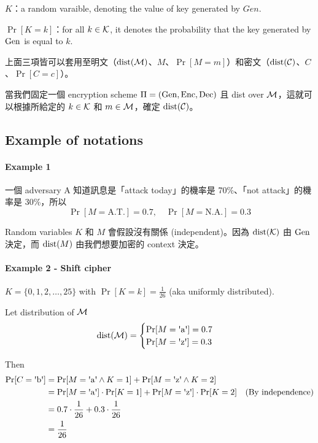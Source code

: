 \(K\)：a random varaible, denoting the value of key generated by \(Gen\).

\(\Pr[K = k]\)：for all \(k \in \operatorname{\mathcal{K}}\), it denotes the probability that the key generated by \(\operatorname{Gen}\) is equal to \(k\).

上面三項皆可以套用至明文（\(\operatorname{dist}(\operatorname{\mathcal{M}})\)、\(M\)、\(\Pr[M = m]\)）和密文（\(\operatorname{dist}(\operatorname{\mathcal{C}})\)、\(C\)、\(\Pr[C = c]\)）。

當我們固定一個 encryption scheme \(\Pi = (\operatorname{Gen}, \operatorname{Enc}, \operatorname{Dec})\) 且 dist over \(\operatorname{\mathcal{M}}\)，這就可以根據所給定的 \(k \in \operatorname{\mathcal{K}}\) 和 \(m \in \operatorname{\mathcal{M}}\)，確定 \(\operatorname{dist}(\operatorname{\mathcal{C}})\)。


\subsection{Example of notations}


\paragraph{Example 1}

一個 adversary A 知道訊息是「attack today」的機率是 70\%、「not attack」的機率是 30\%，所以
\[\Pr[M=\mathrm{A.T.}] = 0.7, \quad \Pr[M=\mathrm{N.A.}] = 0.3\]

Random variables \(K\) 和 \(M\) 會假設沒有關係 (independent)。因為 \(\operatorname{dist}(\operatorname{\mathcal{K}})\) 由 \(\operatorname{Gen}\) 決定，而 \(\operatorname{dist}(M)\) 由我們想要加密的 context 決定。


\paragraph{Example 2 - Shift cipher}

\(K = \{0, 1, 2, \ldots, 25\}\) with \(\Pr[K = k] = \displaystyle{\frac{1}{26}}\) (aka uniformly distributed).

Let distribution of \(\operatorname{\mathcal{M}}\)
\begin{equation*}
	\dist(\M) =
		\begin{cases}
			\Pr[M = \text{\textquotesingle{}a\textquotesingle}] = 0.7 \\
			\Pr[M = \text{\textquotesingle{}z\textquotesingle}] = 0.3
		\end{cases}
\end{equation*}

Then
\begin{align*}
	\Pr[C = \text{\textquotesingle{}b\textquotesingle}] &= 
			\Pr[M = \text{\textquotesingle{}a\textquotesingle} \wedge K = 1] +
			\Pr[M = \text{\textquotesingle{}z\textquotesingle} \wedge K = 2] \\
		&= \Pr[M = \text{\textquotesingle{}a\textquotesingle}] \cdot \Pr[K = 1] + 
			\Pr[M = \text{\textquotesingle{}z\textquotesingle}] \cdot \Pr[K = 2]
			\quad \text{(By independence)} \\
		&= 0.7 \cdot \frac{1}{26} + 0.3 \cdot \frac{1}{26} \\
		&= \frac{1}{26}
\end{align*}

